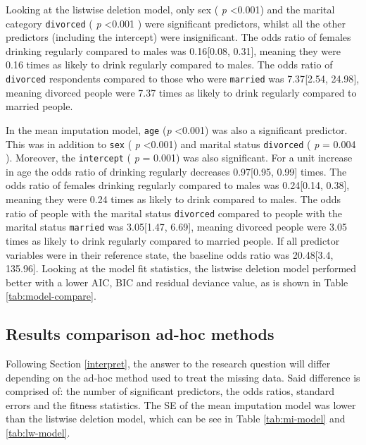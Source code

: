 \documentclass[
]{article}
\begin{document}
Looking at the listwise deletion model, only sex ( \emph{p} \textless0.001) and the marital category \texttt{divorced} ( \emph{p} \textless0.001 ) were significant predictors, whilst all the other predictors (including the intercept) were insignificant. The odds ratio of females drinking regularly compared to males was 0.16{[}0.08, 0.31{]}, meaning they were 0.16 times as likely to drink regularly compared to males. The odds ratio of \texttt{divorced} respondents compared to those who were \texttt{married} was
7.37{[}2.54, 24.98{]},
meaning divorced people were 7.37 times as likely to drink regularly compared to married people.

In the mean imputation model, \texttt{age} (\emph{p} \textless0.001) was also a significant predictor. This was in addition to \texttt{sex} ( \emph{p} \textless0.001) and marital status \texttt{divorced} ( \emph{p} = 0.004 ). Moreover, the \texttt{intercept} ( \emph{p} = 0.001) was also significant. For a unit increase in age the odds ratio of drinking regularly decreases
0.97{[}0.95, 0.99{]}
times. The odds ratio of females drinking regularly compared to males was
0.24{[}0.14, 0.38{]},
meaning they were 0.24 times as likely to drink compared to males. The odds ratio of people with the marital status \texttt{divorced} compared to people with the marital status \texttt{married} was
3.05{[}1.47, 6.69{]},
meaning divorced people were 3.05 times as likely to drink regularly compared to married people. If all predictor variables were in their reference state, the baseline odds ratio was
20.48{[}3.4, 135.96{]}.
Looking at the model fit statistics, the listwise deletion model performed better with a lower AIC, BIC and residual deviance value, as is shown in Table \ref{tab:model-compare}.

\hypertarget{results-comparison-ad-hoc-methods}{%
\subsection{Results comparison ad-hoc methods}\label{results-comparison-ad-hoc-methods}}

Following Section \ref{interpret}, the answer to the research question will differ depending on the ad-hoc method used to treat the missing data. Said difference is comprised of: the number of significant predictors, the odds ratios, standard errors and the fitness statistics. The SE of the mean imputation model was lower than the listwise deletion model, which can be see in Table \ref{tab:mi-model} and \ref{tab:lw-model}.
\end{document}

